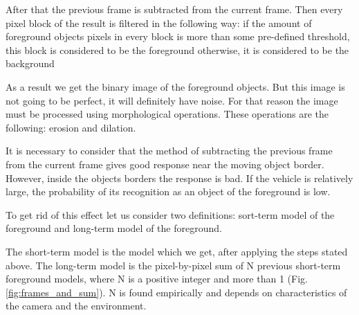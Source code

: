 \documentclass[12pt,a4paper,oneside,titlepage]{article}
\begin{document}
After that the previous frame is subtracted from the current frame.
Then every pixel block of the result is filtered in the following way:
if the amount of foreground objects pixels in every block is more than some pre-defined threshold, this block is considered to be the foreground
otherwise, it is considered to be the background

As a result we get the binary image of the foreground objects.
But this image is not going to be perfect, it will definitely have noise.
For that reason the image must be processed using morphological operations.
These operations are the following: erosion and dilation.

It is necessary to consider that the method of subtracting the previous frame from the current frame gives good response near the moving object border. 
However, inside the objects borders the response is bad.
If the vehicle is relatively large, the probability of its recognition as an object of the foreground is low.

To get rid of this effect let us consider two definitions: sort-term model of the foreground and long-term model of the foreground.

The short-term model is the model which we get, after applying the steps stated above.
The long-term model is the pixel-by-pixel sum of N previous short-term foreground models, where N is a positive integer and more than 1 (Fig.\ref{fig:frames_and_sum}).
N is found empirically and depends on characteristics of the camera and the environment.
\end{document}
